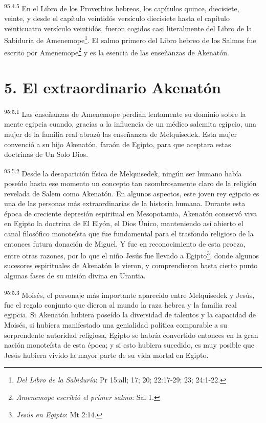 \par
\textsuperscript{95:4.5} En el Libro de los Proverbios hebreos, los capítulos quince, diecisiete, veinte, y desde el capítulo veintidós versículo diecisiete hasta el capítulo veinticuatro versículo veintidós, fueron cogidos casi literalmente del Libro de la Sabiduría de Amenemope\footnote{\textit{Del Libro de la Sabiduría}: Pr 15:all; 17; 20; 22:17-29; 23; 24:1-22.}. El salmo primero del Libro hebreo de los Salmos fue escrito por Amenemope\footnote{\textit{Amenemope escribió el primer salmo}: Sal 1.} y es la esencia de las enseñanzas de Akenatón.

\section*{5. El extraordinario Akenatón}
\par
\textsuperscript{95:5.1} Las enseñanzas de Amenemope perdían lentamente su dominio sobre la mente egipcia cuando, gracias a la influencia de un médico salemita egipcio, una mujer de la familia real abrazó las enseñanzas de Melquisedek. Esta mujer convenció a su hijo Akenatón, faraón de Egipto, para que aceptara estas doctrinas de Un Solo Dios.

\par
\textsuperscript{95:5.2} Desde la desaparición física de Melquisedek, ningún ser humano había poseído hasta ese momento un concepto tan asombrosamente claro de la religión revelada de Salem como Akenatón. En algunos aspectos, este joven rey egipcio es una de las personas más extraordinarias de la historia humana. Durante esta época de creciente depresión espiritual en Mesopotamia, Akenatón conservó viva en Egipto la doctrina de El Elyón, el Dios Único, manteniendo así abierto el canal filosófico monoteísta que fue fundamental para el trasfondo religioso de la entonces futura donación de Miguel. Y fue en reconocimiento de esta proeza, entre otras razones, por lo que el niño Jesús fue llevado a Egipto\footnote{\textit{Jesús en Egipto}: Mt 2:14.}, donde algunos sucesores espirituales de Akenatón le vieron, y comprendieron hasta cierto punto algunas fases de su misión divina en Urantia.

\par
\textsuperscript{95:5.3} Moisés, el personaje más importante aparecido entre Melquisedek y Jesús, fue el regalo conjunto que dieron al mundo la raza hebrea y la familia real egipcia. Si Akenatón hubiera poseído la diversidad de talentos y la capacidad de Moisés, si hubiera manifestado una genialidad política comparable a su sorprendente autoridad religiosa, Egipto se habría convertido entonces en la gran nación monoteísta de esta época; y si esto hubiera sucedido, es muy posible que Jesús hubiera vivido la mayor parte de su vida mortal en Egipto.

